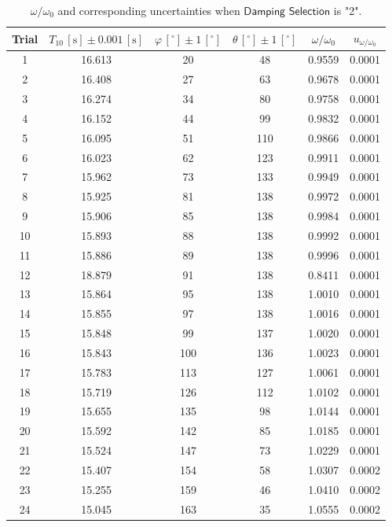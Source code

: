 \documentclass[a4paper]{article}
\begin{document}
\begin{table}[htbp]
\centering
\begin{tabular}{cccccc}
\toprule
Trial & $T_{10}\,[\text{s}]\pm0.001\,[\text{s}]$ & $\varphi\,[^\circ]\pm1\,[^\circ]$ & $\theta\,[^\circ]\pm 1\,[^\circ]$ & $\omega/\omega_0$ & $u_{\omega/\omega_0}$\\
\midrule
1&16.613	&20	&48	&0.9559 	&0.0001 \\
2&16.408	&27	&63	&0.9678 	&0.0001 \\
3&16.274	&34	&80	&0.9758 	&0.0001 \\
4&16.152	&44	&99	&0.9832 	&0.0001 \\
5&16.095	&51	&110	&0.9866 	&0.0001 \\
6&16.023	&62	&123	&0.9911 	&0.0001 \\
7&15.962	&73	&133	&0.9949 	&0.0001 \\
8&15.925	&81	&138	&0.9972 	&0.0001 \\
9&15.906	&85	&138	&0.9984 	&0.0001 \\
10&15.893	&88	&138	&0.9992 	&0.0001 \\
11&15.886	&89	&138	&0.9996 	&0.0001 \\
12&18.879	&91	&138	&0.8411 	&0.0001 \\
13&15.864	&95	&138	&1.0010 	&0.0001 \\
14&15.855	&97	&138	&1.0016 	&0.0001 \\
15&15.848	&99	&137	&1.0020 	&0.0001 \\
16&15.843	&100	&136	&1.0023 	&0.0001 \\
17&15.783	&113	&127	&1.0061 	&0.0001 \\
18&15.719	&126	&112	&1.0102 	&0.0001 \\
19&15.655	&135	&98	&1.0144 	&0.0001 \\
20&15.592	&142	&85	&1.0185 	&0.0001 \\
21&15.524	&147	&73	&1.0229 	&0.0001 \\
22&15.407	&154	&58	&1.0307 	&0.0002 \\
23&15.255	&159	&46	&1.0410 	&0.0002 \\
24&15.045	&163	&35	&1.0555 	&0.0002 \\
\bottomrule
\end{tabular}
\caption{$\omega/\omega_0$ and corresponding uncertainties when $\textsf{Damping Selection}$ is "2".}\label{Tab:graphdamping2}
\end{table}
\end{document}
